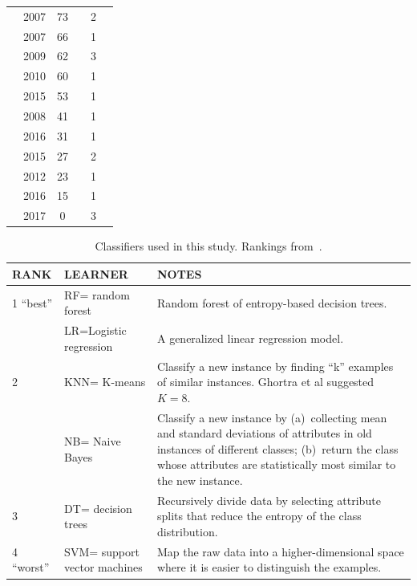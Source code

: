 \documentclass[sigconf,review, anonymous]{acmart}
\newcommand{\cmark}{\ding{51}}%
\newcommand{\xmark}{\ding{55}}%
\theoremstyle{break}
\theoremstyle{break}
\begin{document}
\begin{table}[!htbp]
\begin{tabular}{c|c|c|c|c|c}
        \cite{kamei2007effects} & 2007 & 73 & \xmark & 2 & \cmark\\  
        \cite{pelayo2007applying} & 2007 & 66 & \xmark & 1 & \cmark \\  
        \cite{jiang2009variance} & 2009 & 62 & \cmark & 3 & \xmark  \\ 
        \cite{khoshgoftaar2010attribute} & 2010 & 60 & \cmark & 1 & \cmark  \\  
        \cite{ghotra2015revisiting} & 2015 & 53 & \cmark & 1 & \xmark  \\  
        \cite{jiang2008can} & 2008 & 41 & \cmark & 1 & \xmark  \\  
         \cite{tantithamthavorn2016automated} & 2016 & 31 & \cmark & 1 & \xmark  \\ 
        \cite{tan2015online} & 2015 & 27 & \xmark & 2 & \cmark \\  
        \cite{pelayo2012evaluating} & 2012 & 23 & \xmark & 1 & \cmark \\  
        \cite{fu2016tuning} & 2016 & 15 & \cmark & 1 & \xmark  \\  
        \cite{bennin2017mahakil} & 2017 & 0 & \cmark & 3 & \cmark \\
\end{tabular}
\vspace{-0.3cm}
\end{table}

 \begin{table}[!htbp]
 \caption{Classifiers used in this study.
 Rankings
 from~\cite{ghotra2015revisiting}.}
 \vspace{-0.2cm}
 \label{tbl:learners}
 \small
 \begin{tabular}{l|l|p{4.5in}}
{\bf RANK} & {\bf LEARNER} & {\bf NOTES}\\\hline
 1 ``best'' & RF= random forest & 
 Random forest of entropy-based decision trees.\\\cline{2-3}
 &  LR=Logistic regression &
 A generalized linear regression
model.\\\hline
 2 & KNN= K-means &  Classify a new instance by finding ``k'' examples of similar instances.
 Ghortra et al suggested
 $K=8$.\\\cline{2-3}
 & NB= Naive Bayes &  Classify a new instance by (a)~collecting mean and standard deviations of attributes in old instances of  different classes; (b)~return the class whose attributes are statistically most similar to the new instance.\\\hline
 3 & DT= decision trees & Recursively
 divide data by selecting attribute splits
 that reduce the entropy of the class distribution.\\\hline

 4 ``worst'' & SVM= support vector machines &
 Map the raw data into a higher-dimensional space where it is easier to distinguish the examples.
 \\\hline
 \end{tabular}
 \end{table}
\end{document}
